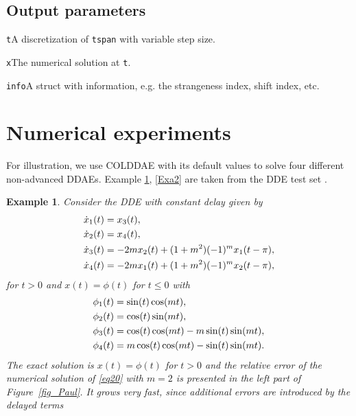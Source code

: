 \documentclass[final,reqno]{siamltex}
\renewenvironment{itemize}[1]{\begin{compactitem}#1}{\end{compactitem}}
\newtheorem{example}[theorem]{Example}
\begin{document}
\subsection{Output parameters}
\begin{itemize}
\item {\tt t}\quad A discretization of {\tt tspan} with variable step size.
\item {\tt x}\quad The numerical solution at {\tt t}.
\item {\tt info}\quad A struct with information, e.g. the strangeness index, shift index, etc.
\end{itemize}

\section{Numerical experiments}
For illustration, we use COLDDAE with its default values to solve four different non-advanced DDAEs.
Example \ref{Exa1}, \ref{Exa2} are taken from the DDE test set \cite{Pau94}.
%
\begin{example}\label{Exa1} {\rm Consider the DDE with constant delay given by
%
\bsq\label{eq20}
\begin{equation}\label{eq20a}
\bsp{
\dot{x}_1(t) & = x_3(t),\\
\dot{x}_2(t) & = x_4(t),\\
\dot{x}_3(t) & = -2mx_2(t)+(1+m^2)(-1)^mx_1(t-\pi),\\
\dot{x}_4(t) & = -2mx_1(t)+(1+m^2)(-1)^mx_2(t-\pi),
}
\end{equation}
for $t>0$ and $x(t)=\phi(t)$ for $t\leq 0$ with
\begin{equation}\label{eq20b}
\bsp{
{\phi}_1(t) & = \sin(t)\cos(mt),\\
{\phi}_2(t) & = \cos(t)\sin(mt),\\
{\phi}_3(t) & = \cos(t)\cos(mt)-m\sin(t)\sin(mt),\\
{\phi}_4(t) & =m\cos(t)\cos(mt)-\sin(t)\sin(mt).
}
\end{equation}
\esq
%
The exact  solution is $x(t)=\phi(t)$ for $t>0$ and the relative error of the numerical solution of \eqref{eq20} with $m=2$ is presented in the left part of Figure~\ref{fig_Paul}. It grows very  fast, since additional errors are introduced by the delayed terms
}
\end{example}
%
\end{document}
